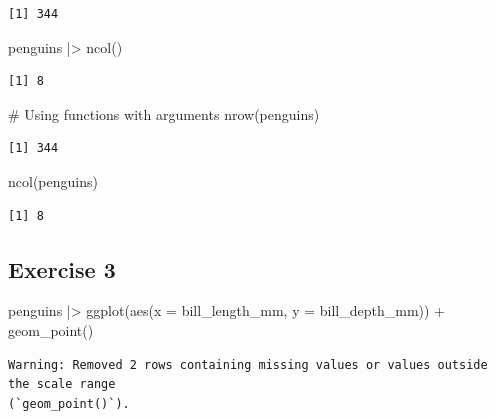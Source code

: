 \documentclass[
  letterpaper,
  DIV=11,
  numbers=noendperiod]{scrreprt}
\newenvironment{Shaded}{\begin{snugshade}}{\end{snugshade}}
\newcommand{\AttributeTok}[1]{\textcolor[rgb]{0.40,0.45,0.13}{#1}}
\newcommand{\CommentTok}[1]{\textcolor[rgb]{0.37,0.37,0.37}{#1}}
\newcommand{\FunctionTok}[1]{\textcolor[rgb]{0.28,0.35,0.67}{#1}}
\newcommand{\NormalTok}[1]{\textcolor[rgb]{0.00,0.23,0.31}{#1}}
\newcommand{\SpecialCharTok}[1]{\textcolor[rgb]{0.37,0.37,0.37}{#1}}
\begin{document}
\begin{verbatim}
[1] 344
\end{verbatim}

\begin{Shaded}
\begin{Highlighting}[]
\NormalTok{penguins }\SpecialCharTok{|\textgreater{}} \FunctionTok{ncol}\NormalTok{()}
\end{Highlighting}
\end{Shaded}

\begin{verbatim}
[1] 8
\end{verbatim}

\begin{Shaded}
\begin{Highlighting}[]
\CommentTok{\# Using functions with arguments}
\FunctionTok{nrow}\NormalTok{(penguins)}
\end{Highlighting}
\end{Shaded}

\begin{verbatim}
[1] 344
\end{verbatim}

\begin{Shaded}
\begin{Highlighting}[]
\FunctionTok{ncol}\NormalTok{(penguins)}
\end{Highlighting}
\end{Shaded}

\begin{verbatim}
[1] 8
\end{verbatim}

\subsection{Exercise 3}\label{exercise-3-3}

\begin{Shaded}
\begin{Highlighting}[]
\NormalTok{penguins }\SpecialCharTok{|\textgreater{}}
  \FunctionTok{ggplot}\NormalTok{(}\FunctionTok{aes}\NormalTok{(}\AttributeTok{x =}\NormalTok{ bill\_length\_mm, }\AttributeTok{y =}\NormalTok{ bill\_depth\_mm)) }\SpecialCharTok{+}
  \FunctionTok{geom\_point}\NormalTok{()}
\end{Highlighting}
\end{Shaded}

\begin{verbatim}
Warning: Removed 2 rows containing missing values or values outside the scale range
(`geom_point()`).
\end{verbatim}
\end{document}
